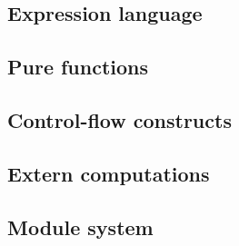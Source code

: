 \subsection{Expression language}


\subsection{Pure functions}


\subsection{Control-flow constructs}

\subsection{Extern computations}

\subsection{Module system}
